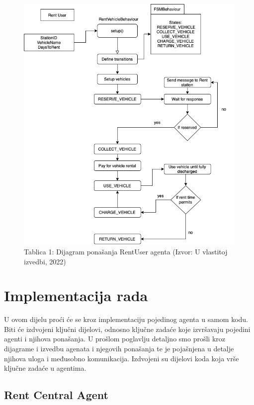\documentclass{foi}
\begin{document}
\begin{figure}[h!]
	\centering
	\includegraphics[width=1\textwidth]{slike/rentUser.png}
	\caption{Tablica 1: Dijagram ponašanja RentUser agenta (Izvor: U vlastitoj izvedbi, 2022)}
\end{figure}


\chapter{Implementacija rada}

U ovom dijelu proći će se kroz implementaciju pojedinog agenta u samom kodu. Biti će izdvojeni ključni dijelovi, odnosno ključne zadaće koje izvršavaju pojedini agenti i njihova ponašanja. U prošlom poglavlju detaljno smo prošli kroz dijagrame i izvedbu agenata i njegovih ponašanja te je pojašnjena u detalje njihova uloga i međusobno komunikacija. Izdvojeni su dijelovi koda koja vrše ključne zadaće u agentima.

\section{Rent Central Agent}
\end{document}
